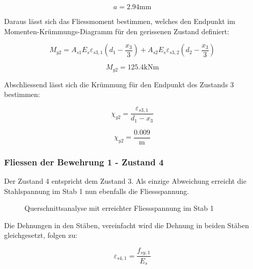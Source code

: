 \documentclass[
  12pt,
  letterpaper,
  egregdoesnotlikesansseriftitles]{scrreprt}
\begin{document}
\begin{equation}a = 2.94 \text{mm}\end{equation}

Daraus lässt sich das Fliessmoment bestimmen, welches den Endpunkt im
Momenten-Krümmungs-Diagramm für den gerissenen Zustand definiert:

\begin{equation}M_{y 2} = A_{s 1} E_{s} \varepsilon_{s3,1} \left(d_{1} - \frac{x_{3}}{3}\right) + A_{s 2} E_{s} \varepsilon_{s3,2} \left(d_{2} - \frac{x_{3}}{3}\right)\end{equation}

\begin{equation}M_{y 2} = 125.4 \text{kN} \text{m}\end{equation}

Abschliessend lässt sich die Krümmung für den Endpunkt des Zustands 3
bestimmen:

\begin{equation}\chi_{y2} = \frac{\varepsilon_{s3,1}}{d_{1} - x_{3}}\end{equation}

\begin{equation}\chi_{y2} = \frac{0.009}{\text{m}}\end{equation}

\subsubsection{Fliessen der Bewehrung 1 - Zustand
4}\label{fliessen-der-bewehrung-1---zustand-4}

Der Zustand 4 entspricht dem Zustand 3. Als einzige Abweichung erreicht
die Stahlspannung im Stab 1 nun ebenfalls die Fliessspannung.

\begin{figure}[H]


\caption{\label{fig-qs5_sv14}Querschnittsanalyse mit erreichter
Fliessspannung im Stab 1}

\end{figure}%

Die Dehnungen in den Stäben, vereinfacht wird die Dehnung in beiden
Stäben gleichgesetzt, folgen zu:

\begin{equation}\varepsilon_{s4,1} = \frac{f_{sy,1}}{E_{s}}\end{equation}
\end{document}
